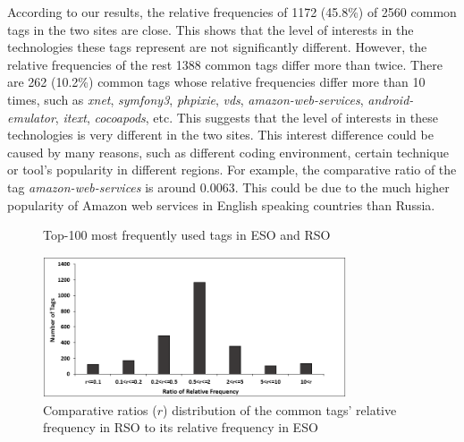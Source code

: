 According to our results, the relative frequencies of 1172 (45.8\%) of 2560 common tags in the two sites are close.
This shows that the level of interests in the technologies these tags represent are not significantly different.
However, the relative frequencies of the rest 1388 common tags differ more than twice.
There are 262 (10.2\%) common tags whose relative frequencies differ more than 10 times, such as \textit{xnet}, \textit{symfony3}, \textit{phpixie}, \textit{vds}, \textit{amazon-web-services}, \textit{android-emulator}, \textit{itext}, \textit{cocoapods}, etc. 
This suggests that the level of interests in these technologies is very different in the two sites.
This interest difference could be caused by many reasons, such as different coding environment, certain technique or tool's popularity in different regions. 
For example, the comparative ratio of the tag \textit{amazon-web-services} is around 0.0063. 
This could be due to the much higher popularity of Amazon web services in English speaking countries than Russia.

\begin{figure}
	\centering
	\hfill
	\caption{Top-100 most frequently used tags in ESO and RSO}
	\label{fig:tagclouds}
\end{figure}

\begin{figure}
	\centering
	\includegraphics[width = 0.8\textwidth]{figures/relfreqbar.png}
	\caption{Comparative ratios ($r$) distribution of the common tags' relative frequency in RSO to its relative frequency in ESO}
	\centering
	\label{fig:relfreqbar}
\end{figure}

